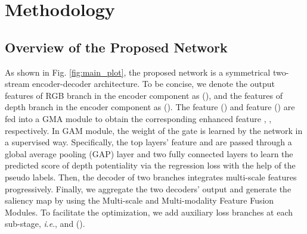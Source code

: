 \documentclass[journal]{IEEEtran}
\newcommand{\ie}{\textit{i}.\textit{e}.}
\begin{document}
\section{Methodology}
\subsection{Overview of the Proposed Network}
As shown in Fig. \ref{fig:main_plot}, the proposed network is a symmetrical two-stream encoder-decoder architecture. To be concise, we denote the output features of RGB branch in the encoder component as  (), and the features of depth branch in the encoder component as  (). The feature  () and feature  () are fed into a GMA module to obtain the corresponding enhanced feature , , respectively. In GAM module, the weight of the gate is learned by the network in a supervised way. Specifically, the top layers' feature  and  are passed through a global average pooling (GAP) layer and two fully connected layers to learn the predicted score of depth potentiality via the regression loss with the help of the pseudo labels.
Then, the decoder of two branches integrates multi-scale features progressively. Finally, we aggregate the two decoders' output and generate the saliency map by using the Multi-scale and Multi-modality Feature Fusion Modules. To facilitate the optimization, we add auxiliary loss branches at each sub-stage, \ie,  and  ().
\end{document}
